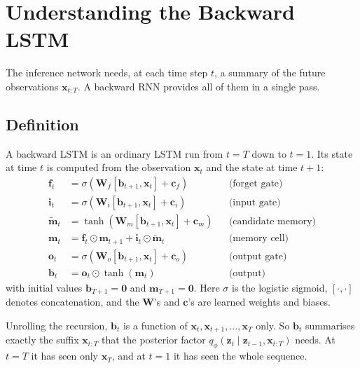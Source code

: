 \section{Understanding the Backward LSTM}\label{sec:backward_lstm}

The inference network needs, at each time step $t$, a summary of the
future observations $\mathbf{x}_{t:T}$. A backward RNN provides all of
them in a single pass.

\subsection*{Definition}

A backward LSTM is an ordinary LSTM run from $t = T$ down to $t = 1$. Its
state at time $t$ is computed from the observation $\mathbf{x}_t$ and the
state at time $t+1$:
\begin{align*}
    \mathbf{f}_t &= \sigma(\mathbf{W}_f [\mathbf{b}_{t+1}, \mathbf{x}_t]
    + \mathbf{c}_f) & &\text{(forget gate)}\\
    \mathbf{i}_t &= \sigma(\mathbf{W}_i [\mathbf{b}_{t+1}, \mathbf{x}_t]
    + \mathbf{c}_i) & &\text{(input gate)}\\
    \tilde{\mathbf{m}}_t &= \tanh(\mathbf{W}_m [\mathbf{b}_{t+1},
    \mathbf{x}_t] + \mathbf{c}_m) & &\text{(candidate memory)}\\
    \mathbf{m}_t &= \mathbf{f}_t \odot \mathbf{m}_{t+1} + \mathbf{i}_t
    \odot \tilde{\mathbf{m}}_t & &\text{(memory cell)}\\
    \mathbf{o}_t &= \sigma(\mathbf{W}_o [\mathbf{b}_{t+1}, \mathbf{x}_t]
    + \mathbf{c}_o) & &\text{(output gate)}\\
    \mathbf{b}_t &= \mathbf{o}_t \odot \tanh(\mathbf{m}_t) & &
    \text{(output)}
\end{align*}
with initial values $\mathbf{b}_{T+1} = \mathbf{0}$ and
$\mathbf{m}_{T+1} = \mathbf{0}$. Here $\sigma$ is the logistic sigmoid,
$[\cdot, \cdot]$ denotes concatenation, and the $\mathbf{W}$'s and
$\mathbf{c}$'s are learned weights and biases.

\begin{inwords}
Unrolling the recursion, $\mathbf{b}_t$ is a function of
$\mathbf{x}_t, \mathbf{x}_{t+1}, \dots, \mathbf{x}_T$ only. So
$\mathbf{b}_t$ summarises exactly the suffix $\mathbf{x}_{t:T}$ that the
posterior factor $q_\phi(\mathbf{z}_t \mid \mathbf{z}_{t-1},
\mathbf{x}_{t:T})$ needs. At $t = T$ it has seen only $\mathbf{x}_T$, and
at $t = 1$ it has seen the whole sequence.
\end{inwords}

